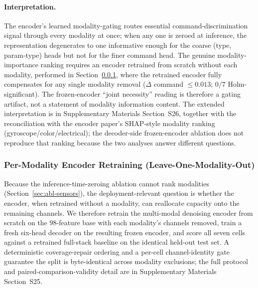 \documentclass[sensors,article,submit,moreauthors,pdftex]{Definitions/mdpi}
\begin{document}
\paragraph{Interpretation.} The encoder's learned modality-gating routes essential command-discrimination signal through every modality at once; when any one is zeroed at inference, the representation degenerates to one informative enough for the coarse (type, param-type) heads but not for the finer command head. The genuine modality-importance ranking requires an encoder retrained from scratch without each modality, performed in Section~\ref{sec:abl-lomo}, where the retrained encoder fully compensates for any single modality removal ($\Delta$ command $\le 0.013$; $0/7$ Holm-significant). The frozen-encoder ``joint necessity'' reading is therefore a gating artifact, not a statement of modality information content. The extended interpretation is in Supplementary Materials Section~S26, together with the reconciliation with the encoder paper's SHAP-style modality ranking (gyroscope/color/electrical); the decoder-side frozen-encoder ablation does not reproduce that ranking because the two analyses answer different questions.

\subsubsection{Per-Modality Encoder Retraining (Leave-One-Modality-Out)}
\label{sec:abl-lomo}

Because the inference-time-zeroing ablation cannot rank modalities (Section~\ref{sec:abl-sensors}), the deployment-relevant question is whether the encoder, when retrained without a modality, can reallocate capacity onto the remaining channels. We therefore retrain the multi-modal denoising encoder from scratch on the $98$-feature base with each modality's channels removed, train a fresh six-head decoder on the resulting frozen encoder, and score all seven cells against a retrained full-stack baseline on the identical held-out test set. A deterministic coverage-repair ordering and a per-cell channel-identity gate guarantee the split is byte-identical across modality exclusions; the full protocol and paired-comparison-validity detail are in Supplementary Materials Section~S25.
\end{document}
